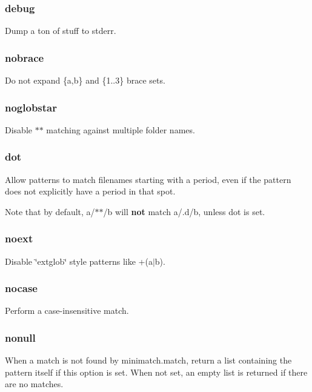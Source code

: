 \subsubsection*{debug}

Dump a ton of stuff to stderr.

\subsubsection*{nobrace}

Do not expand {\ttfamily \{a,b\}} and {\ttfamily \{1..3\}} brace sets.

\subsubsection*{noglobstar}

Disable {\ttfamily $\ast$$\ast$} matching against multiple folder names.

\subsubsection*{dot}

Allow patterns to match filenames starting with a period, even if the pattern does not explicitly have a period in that spot.

Note that by default, {\ttfamily a/$\ast$$\ast$/b} will {\bfseries not} match {\ttfamily a/.d/b}, unless {\ttfamily dot} is set.

\subsubsection*{noext}

Disable \char`\"{}extglob\char`\"{} style patterns like {\ttfamily +(a$\vert$b)}.

\subsubsection*{nocase}

Perform a case-\/insensitive match.

\subsubsection*{nonull}

When a match is not found by {\ttfamily minimatch.\+match}, return a list containing the pattern itself if this option is set. When not set, an empty list is returned if there are no matches.

